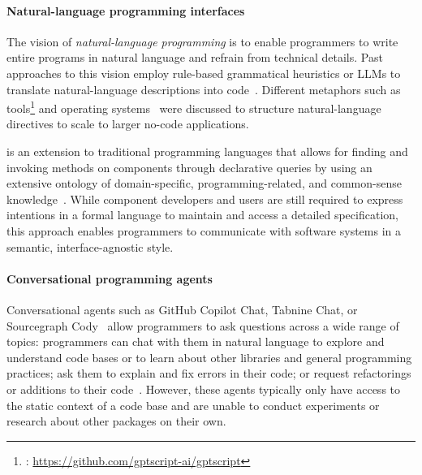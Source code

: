 \paragraph{Natural-language programming interfaces}
\label{sec:related_work/nlp}

The vision of \emph{natural-language programming} is to enable programmers to write entire programs in natural language and refrain from technical details.
Past approaches to this vision employ rule-based grammatical heuristics or LLMs to translate natural-language descriptions into code~\cite{mihalcea2006nlp}.
Different metaphors such as tools\footnote{: \url{https://github.com/gptscript-ai/gptscript}} and operating systems~\cite{mei2024aios} were discussed to structure natural-language directives to scale to larger no-code applications.

 is an extension to traditional programming languages that allows for finding and invoking methods on components through declarative queries by using an extensive ontology of domain-specific, programming-related, and common-sense knowledge~\cite{samimi2014call}.
While component developers and users are still required to express intentions in a formal language to maintain and access a detailed specification, this approach enables programmers to communicate with software systems in a semantic, interface-agnostic style.

\paragraph{Conversational programming agents}
\label{par:related_work/interfaces/agents}

Conversational agents such as GitHub Copilot Chat, Tabnine Chat, or Sourcegraph Cody~\cite{hartman2024ai} allow programmers to ask questions across a wide range of topics:
programmers can chat with them in natural language to explore and understand code bases or to learn about other libraries and general programming practices; ask them to explain and fix errors in their code; or request refactorings or additions to their code~\cite{peter2022designing,kuramitsu2023kogi,stevens2023programmers}.
However, these agents typically only have access to the static context of a code base and are unable to conduct experiments or research about other packages on their own.
